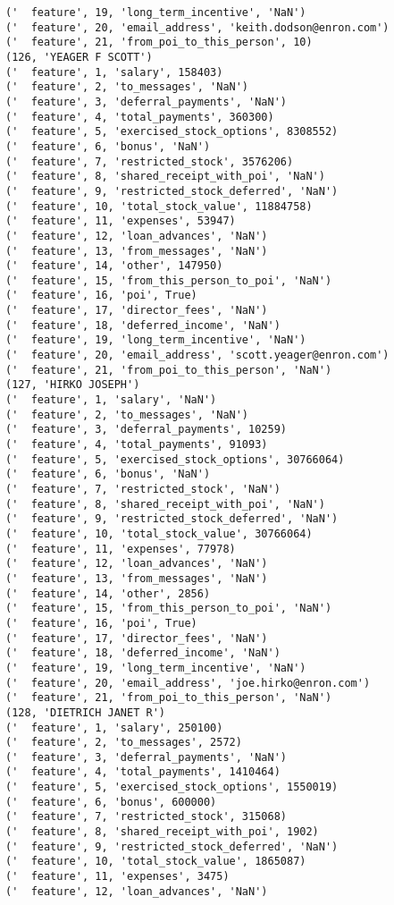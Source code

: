 \begin{verbatim}
('  feature', 19, 'long_term_incentive', 'NaN')
('  feature', 20, 'email_address', 'keith.dodson@enron.com')
('  feature', 21, 'from_poi_to_this_person', 10)
(126, 'YEAGER F SCOTT')
('  feature', 1, 'salary', 158403)
('  feature', 2, 'to_messages', 'NaN')
('  feature', 3, 'deferral_payments', 'NaN')
('  feature', 4, 'total_payments', 360300)
('  feature', 5, 'exercised_stock_options', 8308552)
('  feature', 6, 'bonus', 'NaN')
('  feature', 7, 'restricted_stock', 3576206)
('  feature', 8, 'shared_receipt_with_poi', 'NaN')
('  feature', 9, 'restricted_stock_deferred', 'NaN')
('  feature', 10, 'total_stock_value', 11884758)
('  feature', 11, 'expenses', 53947)
('  feature', 12, 'loan_advances', 'NaN')
('  feature', 13, 'from_messages', 'NaN')
('  feature', 14, 'other', 147950)
('  feature', 15, 'from_this_person_to_poi', 'NaN')
('  feature', 16, 'poi', True)
('  feature', 17, 'director_fees', 'NaN')
('  feature', 18, 'deferred_income', 'NaN')
('  feature', 19, 'long_term_incentive', 'NaN')
('  feature', 20, 'email_address', 'scott.yeager@enron.com')
('  feature', 21, 'from_poi_to_this_person', 'NaN')
(127, 'HIRKO JOSEPH')
('  feature', 1, 'salary', 'NaN')
('  feature', 2, 'to_messages', 'NaN')
('  feature', 3, 'deferral_payments', 10259)
('  feature', 4, 'total_payments', 91093)
('  feature', 5, 'exercised_stock_options', 30766064)
('  feature', 6, 'bonus', 'NaN')
('  feature', 7, 'restricted_stock', 'NaN')
('  feature', 8, 'shared_receipt_with_poi', 'NaN')
('  feature', 9, 'restricted_stock_deferred', 'NaN')
('  feature', 10, 'total_stock_value', 30766064)
('  feature', 11, 'expenses', 77978)
('  feature', 12, 'loan_advances', 'NaN')
('  feature', 13, 'from_messages', 'NaN')
('  feature', 14, 'other', 2856)
('  feature', 15, 'from_this_person_to_poi', 'NaN')
('  feature', 16, 'poi', True)
('  feature', 17, 'director_fees', 'NaN')
('  feature', 18, 'deferred_income', 'NaN')
('  feature', 19, 'long_term_incentive', 'NaN')
('  feature', 20, 'email_address', 'joe.hirko@enron.com')
('  feature', 21, 'from_poi_to_this_person', 'NaN')
(128, 'DIETRICH JANET R')
('  feature', 1, 'salary', 250100)
('  feature', 2, 'to_messages', 2572)
('  feature', 3, 'deferral_payments', 'NaN')
('  feature', 4, 'total_payments', 1410464)
('  feature', 5, 'exercised_stock_options', 1550019)
('  feature', 6, 'bonus', 600000)
('  feature', 7, 'restricted_stock', 315068)
('  feature', 8, 'shared_receipt_with_poi', 1902)
('  feature', 9, 'restricted_stock_deferred', 'NaN')
('  feature', 10, 'total_stock_value', 1865087)
('  feature', 11, 'expenses', 3475)
('  feature', 12, 'loan_advances', 'NaN')

\end{verbatim}
